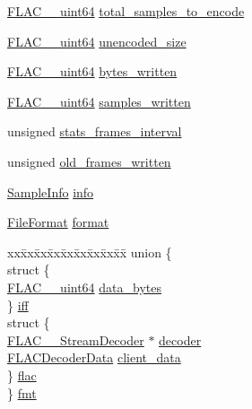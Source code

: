 \begin{DoxyCompactItemize}
\hyperlink{ordinals_8h_aa78c8c70a3eb8a58af7436f278acde8e}{F\+L\+A\+C\+\_\+\+\_\+uint64} \hyperlink{struct_encoder_session_a0923962b8a6f2292c1afaa0a91bca47a}{total\+\_\+samples\+\_\+to\+\_\+encode}
\item 
\hyperlink{ordinals_8h_aa78c8c70a3eb8a58af7436f278acde8e}{F\+L\+A\+C\+\_\+\+\_\+uint64} \hyperlink{struct_encoder_session_adb61d728bf00fd7378da544237f2e6f8}{unencoded\+\_\+size}
\item 
\hyperlink{ordinals_8h_aa78c8c70a3eb8a58af7436f278acde8e}{F\+L\+A\+C\+\_\+\+\_\+uint64} \hyperlink{struct_encoder_session_acd26b35cee2e09041e515cb4ae3644bd}{bytes\+\_\+written}
\item 
\hyperlink{ordinals_8h_aa78c8c70a3eb8a58af7436f278acde8e}{F\+L\+A\+C\+\_\+\+\_\+uint64} \hyperlink{struct_encoder_session_af4860ab7aee0bd2845d45f26d8f34a63}{samples\+\_\+written}
\item 
unsigned \hyperlink{struct_encoder_session_a578b43861ecda579c3ab2ca088c001fe}{stats\+\_\+frames\+\_\+interval}
\item 
unsigned \hyperlink{struct_encoder_session_a337f0f4a200c751fdb551125a760d060}{old\+\_\+frames\+\_\+written}
\item 
\hyperlink{struct_sample_info}{Sample\+Info} \hyperlink{struct_encoder_session_a66685cdbc1c3fbf6e7cd6c46ac68e4c0}{info}
\item 
\hyperlink{libflac_2src_2flac_2utils_8h_a610845e6f56e545283af144cbbb99cfe}{File\+Format} \hyperlink{struct_encoder_session_a7f7fac48234e0c25bc644c055b9b37fd}{format}
\item 
\begin{tabbing}
xx\=xx\=xx\=xx\=xx\=xx\=xx\=xx\=xx\=\kill
union \{\\
\>struct \{\\
\>\>\hyperlink{ordinals_8h_aa78c8c70a3eb8a58af7436f278acde8e}{FLAC\_\_uint64} \hyperlink{struct_encoder_session_a9cdd63bbaf3ee8091ebd6c623371fbf3}{data\_bytes}\\
\>\} \hyperlink{struct_encoder_session_ae551a176bf819ca3bdfd48832f07f115}{iff}\\
\>struct \{\\
\>\>\hyperlink{struct_f_l_a_c_____stream_decoder}{FLAC\_\_StreamDecoder} $\ast$ \hyperlink{struct_encoder_session_ad462a60c86e38d18df0bc82f75385e9f}{decoder}\\
\>\>\hyperlink{struct_f_l_a_c_decoder_data}{FLACDecoderData} \hyperlink{struct_encoder_session_abee1215e2c0dc19229ccc269c926957b}{client\_data}\\
\>\} \hyperlink{struct_encoder_session_a9dc8b5e6313d17bd65cdcd4be4428779}{flac}\\
\} \hyperlink{struct_encoder_session_aa0d12d0b72764231d0bfeddfa7f964bb}{fmt}\\


\end{tabbing}
\end{DoxyCompactItemize}
